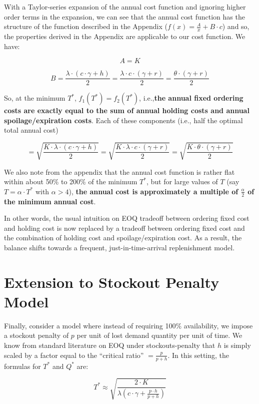 \documentclass[11pt, oneside]{article}   	%
\begin{document}
With a Taylor-series expansion of the annual cost function and ignoring higher order terms in the expansion, we can see that the annual cost function has the structure of the function described in the Appendix ($f(x) = \frac A x + B \cdot c$) and so, the properties derived in the Appendix are applicable to our cost function. We have:

$$A = K$$

$$B = \frac {\lambda \cdot (c \cdot \gamma + h)} 2 = \frac {\lambda \cdot c \cdot (\gamma + r)} 2  = \frac {\theta \cdot (\gamma + r)} 2$$

So, at the minimum $T^*$, $f_1(T^*) = f_2(T^*)$, i.e.,{\bf the annual fixed ordering costs are exactly equal to the sum of annual holding costs and annual spoilage/expiration costs}. Each of these components (i.e., half the optimal total annual cost)

$$ = \sqrt{ \frac {K \cdot \lambda \cdot (c \cdot \gamma + h)} 2} = \sqrt{ \frac {K \cdot \lambda \cdot c \cdot (\gamma + r)} 2}  = \sqrt{ \frac {K \cdot \theta \cdot (\gamma + r)} 2}$$

We also note from the appendix that the annual cost function is rather flat within about 50\% to 200\% of the minimum $T^*$, but for large values of $T$ (say $T = \alpha \cdot T^*$ with $\alpha > 4$), {\bf the annual cost is approximately a multiple of $\frac \alpha 2$ of the minimum annual cost}.

In other words, the usual intuition on EOQ tradeoff between ordering fixed cost and holding cost is now replaced by a tradeoff between ordering fixed cost and the combination of holding cost and spoilage/expiration cost. As a result, the balance shifts towards a frequent, just-in-time-arrival replenishment model.

\section{Extension to Stockout Penalty Model}

Finally, consider a model where instead of requiring 100\% availability, we impose a stockout penalty of $p$ per unit of lost demand quantity per unit of time. We know from standard literature on EOQ under stockouts-penalty that $h$ is simply scaled by a factor equal to the ``critical ratio'' $= \frac {p} {p+h}$. In this setting, the formulas for $T^*$ and $Q^*$ are:

$$T^* \approx \sqrt {\frac {2 \cdot K} {\lambda (c \cdot \gamma + \frac {p \cdot h} {p + h})}}$$
\end{document}
